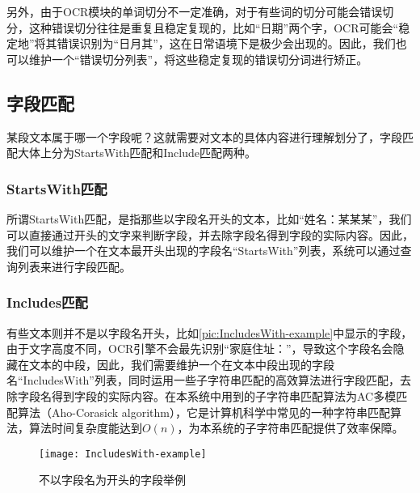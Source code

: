 另外，由于OCR模块的单词切分不一定准确，对于有些词的切分可能会错误切分，这种错误切分往往是重复且稳定复现的，比如“日期”两个字，OCR可能会“稳定地”将其错误识别为“日月其”，这在日常语境下是极少会出现的。因此，我们也可以维护一个“错误切分列表”，将这些稳定复现的错误切分词进行矫正。

\subsection{字段匹配}
某段文本属于哪一个字段呢？这就需要对文本的具体内容进行理解划分了，字段匹配大体上分为StartsWith匹配和Include匹配两种。
\subsubsection*{StartsWith匹配}
所谓StartsWith匹配，是指那些以字段名开头的文本，比如“姓名：某某某”，我们可以直接通过开头的文字来判断字段，并去除字段名得到字段的实际内容。因此，我们可以维护一个在文本最开头出现的字段名“StartsWith”列表，系统可以通过查询列表来进行字段匹配。
\subsubsection*{Includes匹配}
有些文本则并不是以字段名开头，比如\autoref{pic:IncludesWith-example}中显示的字段，由于文字高度不同，OCR引擎不会最先识别“家庭住址：”，导致这个字段名会隐藏在文本的中段，因此，我们需要维护一个在文本中段出现的字段名“IncludesWith”列表，同时运用一些子字符串匹配的高效算法进行字段匹配，去除字段名得到字段的实际内容。在本系统中用到的子字符串匹配算法为AC多模匹配算法（Aho-Corasick algorithm）\citep{aho1975efficient}，它是计算机科学中常见的一种字符串匹配算法，算法时间复杂度能达到$O(n)$，为本系统的子字符串匹配提供了效率保障。
\begin{figure}[htbp]
	\centering
	\caption{不以字段名为开头的字段举例}
	\texttt{[image: IncludesWith-example]}
	\label{pic:IncludesWith-example}
\end{figure}


